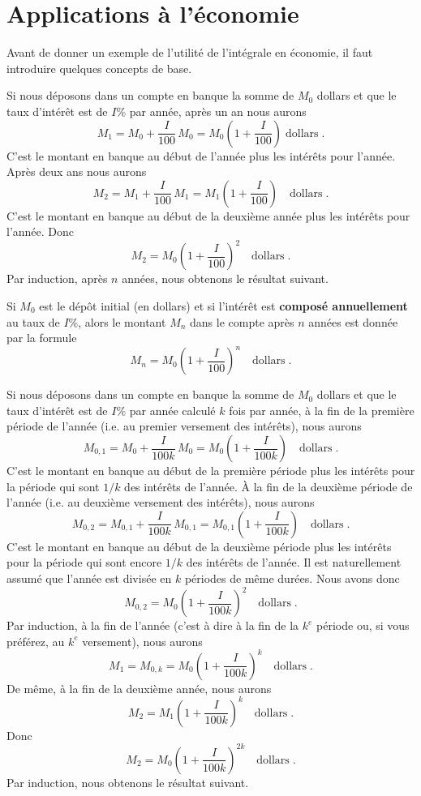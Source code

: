 {\section{Applications à l'économie \eco}

Avant de donner un exemple de l'utilité de l'intégrale en économie, il faut
introduire quelques concepts de base.

Si nous déposons dans un compte en banque la somme de $M_0$ dollars et que le
taux d'intérêt est de $I$\% par année, après un an nous aurons
\[
M_1 = M_0 + \frac{I}{100}\,M_0 = M_0\left(1+\frac{I}{100}\right) \;
\text{dollars}\; .
\]
C'est le montant en banque au début de l'année plus les intérêts pour
l'année.  Après deux ans nous aurons
\[
M_2 = M_1 + \frac{I}{100}\,M_1 = M_1\left(1+\frac{I}{100}\right) \quad
\text{dollars}\; .
\]
C'est le montant en banque au début de la deuxième année plus les intérêts
pour l'année.  Donc
\[
M_2 = M_0\left(1+\frac{I}{100}\right)^2 \quad \text{dollars} \; .
\]
Par induction, après $n$ années, nous obtenons le résultat suivant.

\begin{meth} 
Si $M_0$ est le dépôt initial (en dollars) et si l'intérêt est
{\bfseries composé annuellement}
au taux de $I$\%, alors le montant $M_n$ dans le compte après $n$
années est donnée par la formule
\[
M_n = M_0\left(1+\frac{I}{100}\right)^n \quad \text{dollars} \; .
\]
\end{meth}

Si nous déposons dans un compte en banque la somme de $M_0$ dollars et que le
taux d'intérêt est de $I$\% par année calculé $k$ fois par année, à la fin
de la première période de l'année (i.e. au premier versement des intérêts),
nous aurons
\[
M_{0,1} = M_0+\frac{I}{100k}\,M_0 = M_0\left(1+\frac{I}{100k}\right)
\quad \text{dollars}\; .
\]
C'est le montant en banque au début de la première période plus les intérêts
pour la période qui sont $1/k$ des intérêts de l'année.  À la fin de la
deuxième période de l'année (i.e. au deuxième versement des intérêts), nous
aurons
\[
M_{0,2} = M_{0,1}+\frac{I}{100k}\,M_{0,1}
= M_{0,1}\left(1+\frac{I}{100k}\right)
\quad \text{dollars}\; .
\]
C'est le montant en banque au début de la deuxième période plus les intérêts
pour la période qui sont encore $1/k$ des intérêts de l'année.  Il est
naturellement assumé que l'année est divisée en $k$ périodes de même durées.
Nous avons donc
\[
M_{0,2} = M_0\left(1+\frac{I}{100k}\right)^2 \quad  \text{dollars}\; .
\]
Par induction, à la fin de l'année (c'est à dire à la fin de la $k^e$
période ou, si vous préférez, au $k^e$ versement), nous aurons
\[
M_1 = M_{0,k} = M_0\left(1+\frac{I}{100k}\right)^k \quad
\text{dollars}\; .
\]
De même, à la fin de la deuxième année, nous aurons
\[
M_2 = M_1\left(1+\frac{I}{100k}\right)^k \quad
\text{dollars}\; .
\]
Donc
\[
M_2 = M_0\left(1+\frac{I}{100k}\right)^{2k} \quad
\text{dollars}\; .
\]
Par induction, nous obtenons le résultat suivant.

}
